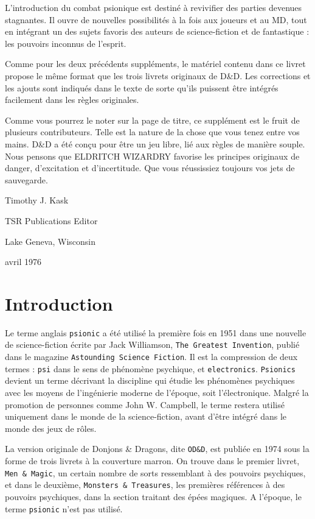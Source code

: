 \documentclass[11pt]{article}
\begin{document}
L'introduction du combat psionique est destiné à revivifier des parties devenues stagnantes. Il ouvre de nouvelles possibilités à la fois aux joueurs et au MD, tout en intégrant un des sujets favoris des auteurs de science-fiction et de fantastique : les pouvoirs inconnus de l'esprit.

Comme pour les deux précédents suppléments, le matériel contenu dans ce livret propose le même format que les trois livrets originaux de D\&D. Les corrections et les ajouts sont indiqués dans le texte de sorte qu'ils puissent être intégrés facilement dans les règles originales.

Comme vous pourrez le noter sur la page de titre, ce supplément est le fruit de plusieurs contributeurs. Telle est la nature de la chose que vous tenez entre vos mains. D\&D a été conçu pour être un jeu libre, lié aux règles de manière souple. Nous pensons que ELDRITCH WIZARDRY favorise les principes originaux de danger, d'excitation et d'incertitude. Que vous réussissiez toujours vos jets de sauvegarde.

\vspace{1cm}

\noindent Timothy J. Kask

\noindent TSR Publications Editor

\noindent Lake Geneva, Wisconsin

 avril 1976

\newpage

\section*{Introduction}

Le terme anglais \texttt{psionic} a été utilisé la première fois en 1951 dans une nouvelle de science-fiction écrite par Jack Williamson, \texttt{The Greatest Invention}, publié dans le magazine \texttt{Astounding Science Fiction}. Il est la compression de deux termes : \texttt{psi} dans le sens de phénomène psychique, et \texttt{electronics}. \texttt{Psionics} devient un terme décrivant la discipline qui étudie les phénomènes psychiques avec les moyens de l'ingénierie moderne de l'époque, soit l'électronique. Malgré la promotion de personnes comme John W. Campbell, le terme restera utilisé uniquement dans le monde de la science-fiction, avant d'être intégré dans le monde des jeux de rôles.

La version originale de Donjons \& Dragons, dite \texttt{OD\&D}, est publiée en 1974 sous la forme de trois livrets à la couverture marron. On trouve dans le premier livret, \texttt{Men \& Magic}, un certain nombre de sorts ressemblant à des pouvoirs psychiques, et dans le deuxième, \texttt{Monsters \& Treasures}, les premières références à des pouvoirs psychiques, dans la section traitant des épées magiques. A l'époque, le terme \texttt{psionic} n'est pas utilisé.
\end{document}
